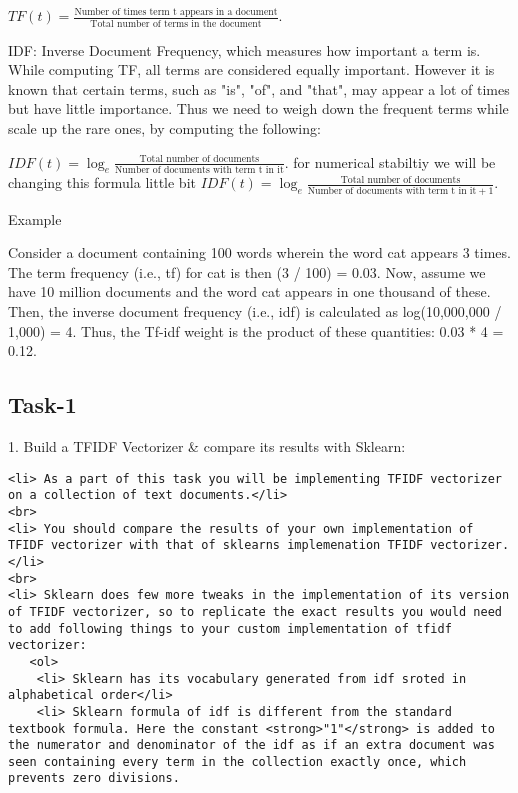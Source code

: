 \documentclass[11pt]{article}
\begin{document}
\(TF(t) = \frac{\text{Number of times term t appears in a document}}{\text{Total number of terms in the document}}.\)

IDF: Inverse Document Frequency, which measures how important a term is.
While computing TF, all terms are considered equally important. However
it is known that certain terms, such as "is", "of", and "that", may
appear a lot of times but have little importance. Thus we need to weigh
down the frequent terms while scale up the rare ones, by computing the
following:

\(IDF(t) = \log_{e}\frac{\text{Total  number of documents}} {\text{Number of documents with term t in it}}.\)
for numerical stabiltiy we will be changing this formula little bit
\(IDF(t) = \log_{e}\frac{\text{Total  number of documents}} {\text{Number of documents with term t in it}+1}.\)

Example

Consider a document containing 100 words wherein the word cat appears 3
times. The term frequency (i.e., tf) for cat is then (3 / 100) = 0.03.
Now, assume we have 10 million documents and the word cat appears in one
thousand of these. Then, the inverse document frequency (i.e., idf) is
calculated as log(10,000,000 / 1,000) = 4. Thus, the Tf-idf weight is
the product of these quantities: 0.03 * 4 = 0.12.

    \subsection{Task-1}\label{task-1}

    1. Build a TFIDF Vectorizer \& compare its results with Sklearn:

\begin{verbatim}
<li> As a part of this task you will be implementing TFIDF vectorizer on a collection of text documents.</li>
<br>
<li> You should compare the results of your own implementation of TFIDF vectorizer with that of sklearns implemenation TFIDF vectorizer.</li>
<br>
<li> Sklearn does few more tweaks in the implementation of its version of TFIDF vectorizer, so to replicate the exact results you would need to add following things to your custom implementation of tfidf vectorizer:
   <ol>
    <li> Sklearn has its vocabulary generated from idf sroted in alphabetical order</li>
    <li> Sklearn formula of idf is different from the standard textbook formula. Here the constant <strong>"1"</strong> is added to the numerator and denominator of the idf as if an extra document was seen containing every term in the collection exactly once, which prevents zero divisions.
        
\end{verbatim}
\end{document}
